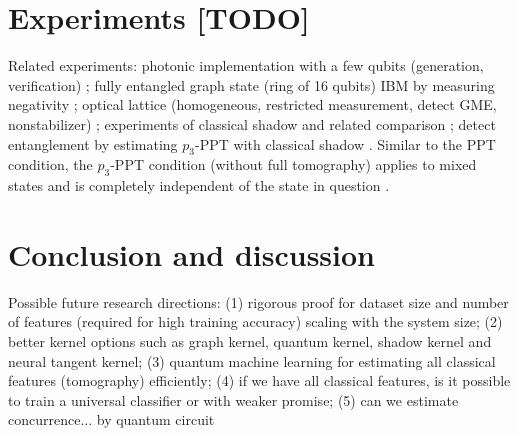 \documentclass[
reprint,
aps,
pra,
floatfix,
]{revtex4-2}
\theoremstyle{plain}
\theoremstyle{definition}
\newcommand{\dm}{\rho}
\begin{document}
\section{Experiments [TODO]}\label{sec:experiments}
Related experiments: photonic implementation with a few qubits (generation, verification) \cite{luEntanglementStructureEntanglement2018};
fully entangled graph state (ring of 16 qubits) IBM by measuring negativity \cite{wang16qubitIBMUniversal2018};
optical lattice (homogeneous, restricted measurement, detect GME, nonstabilizer) \cite{zhouSchemeCreateVerify2022};
experiments of classical shadow and related comparison \cite{zhangExperimentalQuantumState2021};
detect entanglement by estimating $p_3$-PPT with classical shadow \cite{elbenMixedstateEntanglementLocal2020}.
Similar to the PPT condition, the $p_3$-PPT condition (without full tomography) applies to mixed states and is completely independent of the state in question \cite{elbenMixedstateEntanglementLocal2020}. 

\section{Conclusion and discussion}
Possible future research directions:
(1) rigorous proof for dataset size and number of features (required for high training accuracy) scaling with the system size;
(2) better kernel options such as graph kernel, quantum kernel, shadow kernel and neural tangent kernel;
(3) quantum machine learning for estimating all classical features (tomography) efficiently;
(4) if we have all classical features, is it possible to train a universal classifier or with weaker promise;
(5) can we estimate concurrence... by quantum circuit


\begin{acknowledgments}
\end{acknowledgments}



%


\onecolumngrid
\appendix



\end{document}

